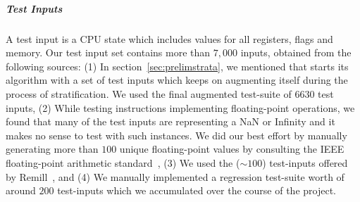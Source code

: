 \vspace{-2pt}
\subparagraph{Test Inputs} %
A test input is a CPU state which includes values for all registers, flags and memory. Our test input set contains more than $7,000$ inputs, obtained from the following sources: 
%    
(1) In section~\ref{sec:prelimstrata}, we mentioned that \Strata starts its algorithm with a set of test inputs which keeps on augmenting itself during the process of stratification. We used the final augmented test-suite of  $6630$ test inputs,
(2) While testing instructions implementing floating-point operations, we found that many of the test inputs are representing a NaN or Infinity and it makes no sense to test with such instances. We did our best effort by manually generating more than $100$ unique floating-point values by  consulting the IEEE floating-point arithmetic standard~\cite{FP}, 
(3) We used the (${\sim}100$) test-inputs offered by Remill~\cite{Remill}, and 
(4) We manually implemented a regression test-suite worth of around $200$ test-inputs which we accumulated over the course of the project.


